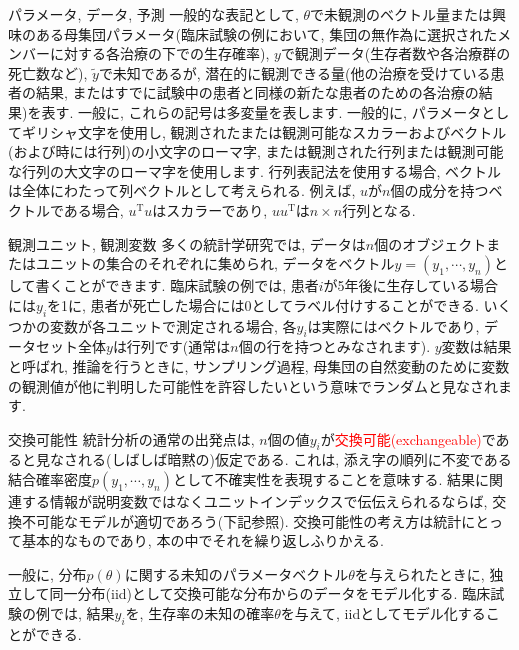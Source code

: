 \documentclass[10pt,dvipdfmx,a4]{beamer}
\newcommand{\tcr}[1]{\textcolor{red}{#1}}
\begin{document}

\begin{frame}{パラメータ, データ, 予測}
一般的な表記として, $\theta$で未観測のベクトル量または興味のある母集団パラメータ(臨床試験の例において, 集団の無作為に選択されたメンバーに対する各治療の下での生存確率), $y$で観測データ(生存者数や各治療群の死亡数など), $\tilde{y}$で未知であるが, 潜在的に観測できる量(他の治療を受けている患者の結果, またはすでに試験中の患者と同様の新たな患者のための各治療の結果)を表す.
一般に, これらの記号は多変量を表します.
一般的に, パラメータとしてギリシャ文字を使用し, 観測されたまたは観測可能なスカラーおよびベクトル(および時には行列)の小文字のローマ字, または観測された行列または観測可能な行列の大文字のローマ字を使用します.
行列表記法を使用する場合, ベクトルは全体にわたって列ベクトルとして考えられる.
例えば, $u$が$n$個の成分を持つベクトルである場合, $u^{\mathrm{T}}u$はスカラーであり, $uu^{\mathrm{T}}$は$n\times n$行列となる.
\end{frame}


\begin{frame}{観測ユニット, 観測変数}
多くの統計学研究では, データは$n$個のオブジェクトまたはユニットの集合のそれぞれに集められ, データをベクトル$y=(y_1, \cdots ,y_n)$として書くことができます.
臨床試験の例では, 患者$i$が5年後に生存している場合には$y_i$を1に, 患者が死亡した場合には0としてラベル付けすることができる.
いくつかの変数が各ユニットで測定される場合, 各$y_i$は実際にはベクトルであり, データセット全体$y$は行列です(通常は$n$個の行を持つとみなされます).
$y$変数は結果と呼ばれ, 推論を行うときに, サンプリング過程, 母集団の自然変動のために変数の観測値が他に判明した可能性を許容したいという意味でランダムと見なされます.
\end{frame}


\begin{frame}{交換可能性}
統計分析の通常の出発点は, $n$個の値$y_i$が\tcr{交換可能(exchangeable)}であると見なされる(しばしば暗黙の)仮定である.
これは, 添え字の順列に不変である結合確率密度$p(y_1,\cdots,y_n)$として不確実性を表現することを意味する.
結果に関連する情報が説明変数ではなくユニットインデックスで伝伝えられるならば, 交換不可能なモデルが適切であろう(下記参照).
交換可能性の考え方は統計にとって基本的なものであり, 本の中でそれを繰り返しふりかえる.

一般に, 分布$p(\theta)$に関する未知のパラメータベクトル$\theta$を与えられたときに, 独立して同一分布(iid)として交換可能な分布からのデータをモデル化する.
臨床試験の例では, 結果$y_i$を, 生存率の未知の確率$\theta$を与えて, iidとしてモデル化することができる.
\end{frame}
\end{document}
